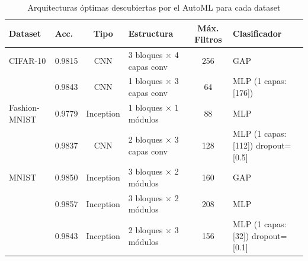 \begin{table}[htbp]
\centering
\caption{Arquitecturas óptimas descubiertas por el AutoML para cada dataset}
\label{tab:arquitecturas_optimas}
\small
\begin{tabular}{llclcp{4cm}}
\toprule
\textbf{Dataset} & \textbf{Acc.} & \textbf{Tipo} & \textbf{Estructura} & \textbf{Máx. Filtros} & \textbf{Clasificador} \\
\midrule
  CIFAR-10 & 0.9815 & CNN & 3 bloques × 4 capas conv & 256 & GAP \\
   & 0.9843 & CNN & 1 bloques × 3 capas conv & 64 & MLP (1 capas: [176]) \\
\midrule
  Fashion-MNIST & 0.9779 & Inception & 1 bloques × 1 módulos & 88 & MLP \\
   & 0.9837 & CNN & 2 bloques × 3 capas conv & 128 & MLP (1 capas: [112]) dropout=[0.5] \\
\midrule
  MNIST & 0.9850 & Inception & 3 bloques × 2 módulos & 160 & GAP \\
   & 0.9857 & Inception & 3 bloques × 2 módulos & 208 & MLP \\
   & 0.9843 & Inception & 2 bloques × 3 módulos & 156 & MLP (1 capas: [32]) dropout=[0.1] \\
\bottomrule
\end{tabular}
\end{table}